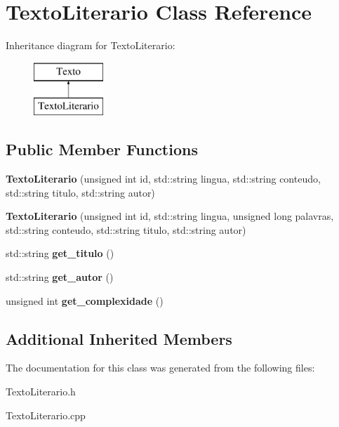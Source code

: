 \hypertarget{class_texto_literario}{\section{Texto\-Literario Class Reference}
\label{class_texto_literario}
}
Inheritance diagram for Texto\-Literario\-:\begin{figure}[H]
\begin{center}
\leavevmode
\includegraphics[height=2.000000cm]{class_texto_literario}
\end{center}
\end{figure}
\subsection*{Public Member Functions}
\begin{DoxyCompactItemize}
\item 
\hypertarget{class_texto_literario_addeb2b30770693455c5395a4a3fb941c}{{\bfseries Texto\-Literario} (unsigned int id, std\-::string lingua, std\-::string conteudo, std\-::string titulo, std\-::string autor)}\label{class_texto_literario_addeb2b30770693455c5395a4a3fb941c}

\item 
\hypertarget{class_texto_literario_ac8484056631c263a653243b80065114b}{{\bfseries Texto\-Literario} (unsigned int id, std\-::string lingua, unsigned long palavras, std\-::string conteudo, std\-::string titulo, std\-::string autor)}\label{class_texto_literario_ac8484056631c263a653243b80065114b}

\item 
\hypertarget{class_texto_literario_adca504c785afdb9e77542b2bdca90a37}{std\-::string {\bfseries get\-\_\-titulo} ()}\label{class_texto_literario_adca504c785afdb9e77542b2bdca90a37}

\item 
\hypertarget{class_texto_literario_acb31c6be6750cea439dde8636bf960ff}{std\-::string {\bfseries get\-\_\-autor} ()}\label{class_texto_literario_acb31c6be6750cea439dde8636bf960ff}

\item 
\hypertarget{class_texto_literario_a7c09b8153bca93502a12fd7fbaa1e225}{unsigned int {\bfseries get\-\_\-complexidade} ()}\label{class_texto_literario_a7c09b8153bca93502a12fd7fbaa1e225}

\end{DoxyCompactItemize}
\subsection*{Additional Inherited Members}


The documentation for this class was generated from the following files\-:\begin{DoxyCompactItemize}
\item 
Texto\-Literario.\-h\item 
Texto\-Literario.\-cpp\end{DoxyCompactItemize}
